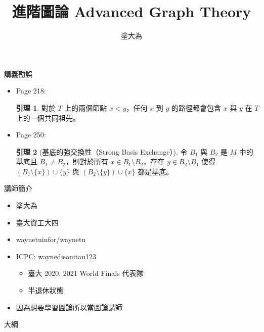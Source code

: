 \documentclass[notheorems,xcolor=dvipsnames]{beamer}
\title{進階圖論 Advanced Graph Theory}
\author{塗大為}
\theoremstyle{definition}
\newtheorem{lemma}{引理}
\begin{document}
\begin{frame}
  \titlepage
\end{frame}

\begin{frame}{講義勘誤}
  \begin{itemize}
    \item Page 218:
      \begin{lemma}
        對於 $T$ 上的兩個節點 $x < y$，任何 $x$ 到 $y$ 的路徑都會包含 $x$ 與 $y$ 在 $T$ 上的一個共同祖先。
      \end{lemma}
    \item Page 250:
      \begin{lemma}[基底的強交換性（Strong Basis Exchange）]
        令 $B_1$ 與 $B_2$ 是 $M$ 中的基底且 $B_1 \neq B_2$，則對於所有 $x \in B_1 \setminus B_2$，存在 $y \in B_2 \setminus B_1$ 使得 $(B_1 \setminus \{x\}) \cup \{y\}$ 與
        $(B_2 \setminus \{y\}) \cup \{x\}$ 都是基底。
    \end{lemma}
  \end{itemize}
\end{frame}

\begin{frame}{講師簡介}
  \begin{itemize}
    \item 塗大為
    \item 臺大資工大四
    \item waynetuinfor/waynetu
    \item ICPC: waynedisonitau123
      \begin{itemize}
        \item 臺大 2020, 2021 World Finals 代表隊
        \item 半退休狀態
      \end{itemize}
    \item 因為想要學習圖論所以當圖論講師
  \end{itemize}
\end{frame}

\begin{frame}{大綱}
  \tableofcontents[hideallsubsections]
\end{frame}




\end{document}
